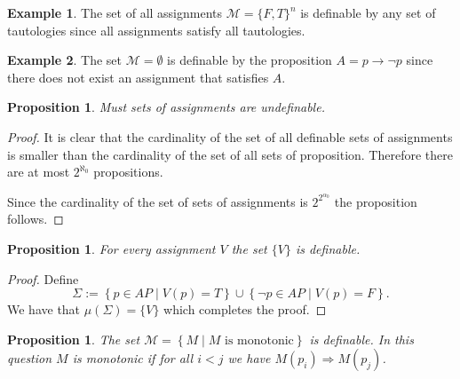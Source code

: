 \documentclass[11pt,a4paper]{article}
\theoremstyle{definition}
\newtheorem{example}{Example}[section]
\theoremstyle{plain}
\newtheorem{proposition}[theorem]{Proposition}
\newcommand{\set}[2]{ \left\{ #1 \mid #2 \right\} }
\renewcommand{\implies}{\rightarrow}
\begin{document}
  \begin{example}
    The set of all assignments $\mathcal M = \{F, T\}^{n}$ is definable
    by any set of tautologies since all assignments satisfy all tautologies.
  \end{example}
  \begin{example}
    The set $\mathcal M = \emptyset$ is definable by the proposition
    $A = p \implies \neg p$ since there does not exist an assignment
    that satisfies $A$.
  \end{example}

  \begin{proposition}
    Must sets of assignments are undefinable.
  \end{proposition}
  \begin{proof}
    It is clear that the cardinality of the set of all definable sets of 
    assignments is smaller than the cardinality of the set of all
    sets of proposition. Therefore there are at most $2^{\aleph_0}$
    propositions.

    Since the cardinality of the set of sets of assignments is
    $2^{2^{\alpha_0}}$ the proposition follows.
  \end{proof}

  \begin{proposition}
    For every assignment $V$ the set $\{V\}$ is definable.
  \end{proposition}
  \begin{proof}
    Define
    \[
      \Sigma :=
      \set{p \in AP}{V(p) = T} \cup
      \set{\neg p \in AP}{V(p) = F}.
    \]
    We have that $\mu(\Sigma) = \{V\}$ which completes the proof.
  \end{proof}

  \begin{proposition}
    The set $\mathcal M = \set{M}{M \text{ is monotonic}}$ is definable.
    In this question $M$ is monotonic if for all $i < j$ we have
    $M(p_i) \Rightarrow M(p_j)$.
  \end{proposition}
\end{document}
